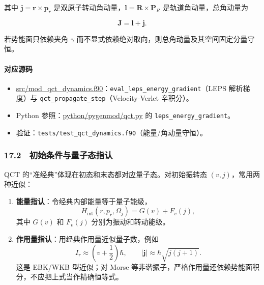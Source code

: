 \documentclass[
]{ctexbook}
\providecommand{\tightlist}{%
  \setlength{\itemsep}{0pt}\setlength{\parskip}{0pt}}
\begin{document}
其中 \(\mathbf j=\mathbf r\times\mathbf p_r\)
是双原子转动角动量，\(\mathbf l=\mathbf R\times\mathbf P_R\)
是轨道角动量，总角动量为

\[
\mathbf J=\mathbf l+\mathbf j.
\]

若势能面只依赖夹角 \(\gamma\)
而不显式依赖绝对取向，则总角动量及其空间固定分量守恒。

\hypertarget{ux5bf9ux5e94ux6e90ux7801-73}{%
\paragraph{对应源码}\label{ux5bf9ux5e94ux6e90ux7801-73}}

\begin{itemize}
\tightlist
\item
  \href{https://github.com/l1Ha/QuantumGeneralModule/blob/main/src/mod_qct_dynamics.f90}{src/mod\_qct\_dynamics.f90}：\texttt{eval\_leps\_energy\_gradient}（LEPS
  解析梯度）与 \texttt{qct\_propagate\_step}（Velocity-Verlet 辛积分）。
\item
  Python
  参照：\href{https://github.com/l1Ha/QuantumGeneralModule/blob/main/python/pygenmod/qct.py}{python/pygenmod/qct.py}
  的 \texttt{leps\_energy\_gradient}。
\item
  验证：\texttt{tests/test\_qct\_dynamics.f90}（能量/角动量守恒）。
\end{itemize}

\hypertarget{ux521dux59cbux6761ux4ef6ux4e0eux91cfux5b50ux6001ux6307ux8ba4}{%
\subsubsection{17.2　初始条件与量子态指认}\label{ux521dux59cbux6761ux4ef6ux4e0eux91cfux5b50ux6001ux6307ux8ba4}}

QCT 的``准经典''体现在初态和末态都对应量子态。对初始振转态
\((v,j)\)，常用两种近似：

\begin{enumerate}
\def\labelenumi{\arabic{enumi}.}
\tightlist
\item
  \textbf{能量指认}：令经典内部能量等于量子能级， \[
  H_{\mathrm{int}}(r,p_r,\Omega_j)=G(v)+F_v(j),
  \] 其中 \(G(v)\) 和 \(F_v(j)\) 分别为振动和转动能级。
\item
  \textbf{作用量指认}：用经典作用量近似量子数，例如 \[
  I_r\approx\left(v+\frac12\right)\hbar,
  \qquad
  |\mathbf j|\approx\hbar\sqrt{j(j+1)}.
  \] 这是 EBK/WKB 型近似；对 Morse
  等非谐振子，严格作用量还依赖势能面积分，不应把上式当作精确恒等式。
\end{enumerate}
\end{document}
